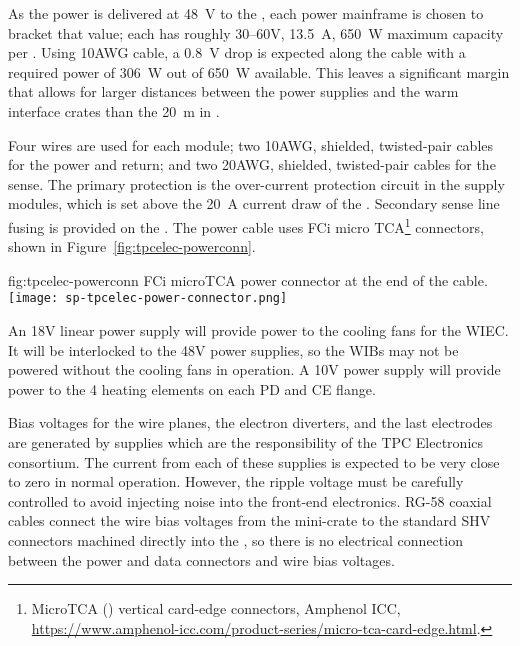 As the  power is delivered at \SI{48}{V} to the , each  power mainframe is chosen to bracket that value; each has  
roughly \numrange{30}{60}{V}, \SI{13.5}{A}, \SI{650}{W} maximum capacity per . Using 10AWG cable, a \SI{0.8}{V} drop is 
expected along the cable with a required power of \SI{306}{W} out of \SI{650}{W} available.  
This leaves a significant margin that allows for larger distances between the power supplies and 
the warm interface crates than the \SI{20}{\meter} in .

Four wires are used for each module; two 10AWG, shielded, twisted-pair cables for the power and return; and two 20AWG, shielded, twisted-pair cables for the sense.
The primary protection is the over-current protection circuit in the  supply modules, 
which is set above the \SI{20}{A} current draw of the .  Secondary sense line fusing is 
provided on the .  The  power cable uses FCi micro TCA\footnote{MicroTCA\texttrademark{} () vertical card-edge connectors, Amphenol ICC,  \url{https://www.amphenol-icc.com/product-series/micro-tca-card-edge.html}.} connectors, shown in
Figure~\ref{fig:tpcelec-powerconn}.

\begin{dunefigure}
{fig:tpcelec-powerconn}
{FCi microTCA power connector at the  end of the cable.}
\texttt{[image: sp-tpcelec-power-connector.png]}
\end{dunefigure}

An 18V linear power supply will provide power to the cooling fans for the WIEC. It will be interlocked to the 48V power 
supplies, so the WIBs may not be powered without the cooling fans in operation. A 10V power supply will provide
power to the 4 heating elements on each PD and CE flange.

Bias voltages for the  wire planes, the electron diverters, and the last  electrodes are generated 
by supplies which are the responsibility of the TPC Electronics consortium.  The current from each of these supplies 
is expected to be very close to zero in normal operation.  However, the ripple voltage must be carefully controlled to 
avoid injecting noise into the front-end electronics.  RG-58 coaxial cables connect the wire bias voltages from the 
mini-crate to the standard SHV connectors machined directly into the  \fdth, so there is no electrical 
connection between the  power and data connectors and wire bias voltages.

